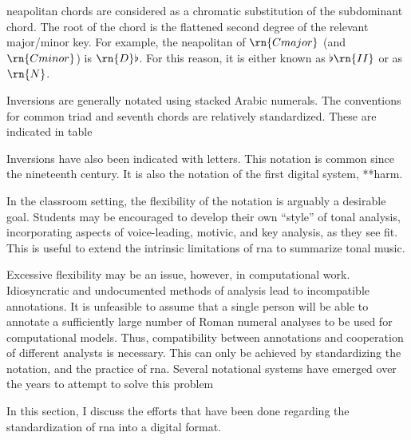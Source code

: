 
\gls{neapolitan} chords are considered as a chromatic substitution
of the subdominant chord. The root of the chord is the
flattened second degree of the relevant major/minor key. For
example, the \gls{neapolitan} of $\rn{C major}$ (and $\rn{C
minor}$) is $\rn{D}\flat$. For this reason, it is either
known as $\flat\rn{II}$ or as $\rn{N}$.

Inversions are generally notated using stacked Arabic
numerals. The conventions for common triad and seventh
chords are relatively standardized. These are indicated in
table 


Inversions have also been indicated with letters. This
notation is common since the nineteenth century. It is also
the notation of the first digital system, **harm.

In the classroom setting, the flexibility of the notation is
arguably a desirable goal. Students may be encouraged to
develop their own ``style'' of tonal analysis, incorporating
aspects of voice-leading, motivic, and key analysis, as they
see fit. This is useful to extend the intrinsic limitations
of \gls{rna} to summarize tonal music.

Excessive flexibility may be an issue, however, in
computational work. Idiosyncratic and undocumented methods
of analysis lead to incompatible annotations. It is
unfeasible to assume that a single person will be able to
annotate a sufficiently large number of Roman numeral
analyses to be used for computational models. Thus,
compatibility between annotations and cooperation of
different analysts is necessary. This can only be achieved
by standardizing the notation, and the practice of
\gls{rna}. Several notational systems have emerged over the
years to attempt to solve this problem

In this section, I discuss the efforts that have been done
regarding the standardization of \gls{rna} into a digital
format.

